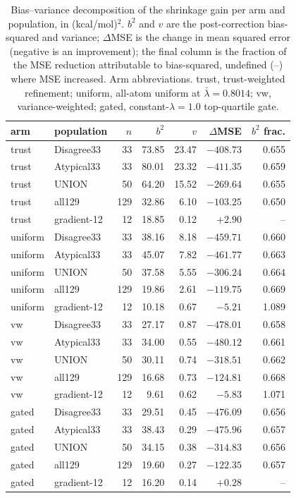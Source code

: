 \documentclass{article}
\begin{document}
\begin{table}[htbp]
  \caption{Bias--variance decomposition of the shrinkage gain per arm and
  population, in (kcal/mol)$^2$. $b^2$ and $v$ are the post-correction
  bias-squared and variance; $\Delta$MSE is the change in mean squared error
  (negative is an improvement); the final column is the fraction of the MSE
  reduction attributable to bias-squared, undefined (--) where MSE
  increased. Arm abbreviations. trust, trust-weighted refinement; uniform,
  all-atom uniform at $\bar\lambda{=}0.8014$; vw, variance-weighted; gated,
  constant-$\lambda=1.0$ top-quartile gate.}
  \label{tab:bias-var}
  \centering
  \renewcommand{\arraystretch}{1.30}
  \small
  \setlength{\tabcolsep}{3pt}
  \begin{tabular}{ll@{\hspace{6pt}}rrrrr}
    \toprule
    arm & population & $n$ & $b^2$ & $v$ & $\Delta$MSE & $b^2$ frac. \\
    \midrule
    trust & Disagree33 & 33 & 73.85 & 23.47 & $-408.73$ & 0.655 \\
    trust & Atypical33 & 33 & 80.01 & 23.32 & $-411.35$ & 0.659 \\
    trust & UNION & 50 & 64.20 & 15.52 & $-269.64$ & 0.655 \\
    trust & all129 & 129 & 32.86 & 6.10 & $-103.25$ & 0.650 \\
    trust & gradient-12 & 12 & 18.85 & 0.12 & $+2.90$ & -- \\
    \midrule
    uniform & Disagree33 & 33 & 38.16 & 8.18 & $-459.71$ & 0.660 \\
    uniform & Atypical33 & 33 & 45.07 & 7.82 & $-461.77$ & 0.663 \\
    uniform & UNION & 50 & 37.58 & 5.55 & $-306.24$ & 0.664 \\
    uniform & all129 & 129 & 19.86 & 2.61 & $-119.75$ & 0.669 \\
    uniform & gradient-12 & 12 & 10.18 & 0.67 & $-5.21$ & 1.089 \\
    \midrule
    vw & Disagree33 & 33 & 27.17 & 0.87 & $-478.01$ & 0.658 \\
    vw & Atypical33 & 33 & 34.00 & 0.55 & $-480.12$ & 0.661 \\
    vw & UNION & 50 & 30.11 & 0.74 & $-318.51$ & 0.662 \\
    vw & all129 & 129 & 16.68 & 0.73 & $-124.81$ & 0.668 \\
    vw & gradient-12 & 12 & 9.61 & 0.62 & $-5.83$ & 1.071 \\
    \midrule
    gated & Disagree33 & 33 & 29.51 & 0.45 & $-476.09$ & 0.656 \\
    gated & Atypical33 & 33 & 38.43 & 0.29 & $-475.96$ & 0.657 \\
    gated & UNION & 50 & 34.15 & 0.38 & $-314.83$ & 0.656 \\
    gated & all129 & 129 & 19.60 & 0.27 & $-122.35$ & 0.657 \\
    gated & gradient-12 & 12 & 16.20 & 0.14 & $+0.28$ & -- \\
    \bottomrule
  \end{tabular}
\end{table}

\newpage


\newpage

\end{document}
